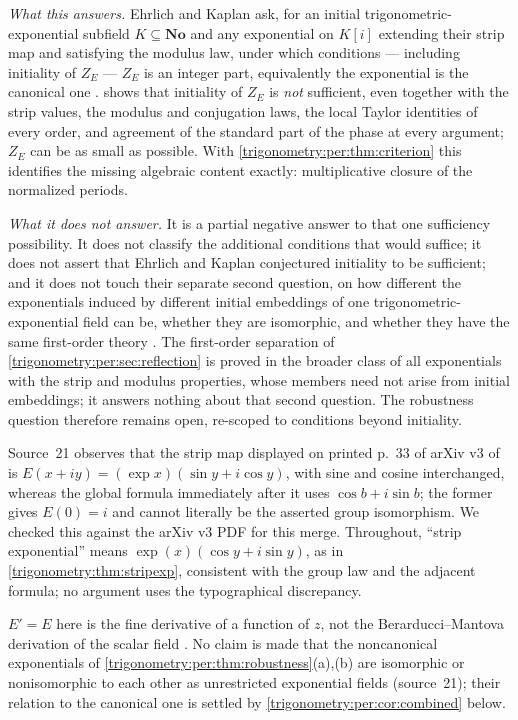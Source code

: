 \documentclass[11pt,letterpaper]{article}
\numberwithin{equation}{section}
\theoremstyle{definition}
\theoremstyle{remark}
\newcommand{\No}{\mathbf{No}}
\begin{document}
\emph{What this answers.} Ehrlich and Kaplan ask, for an initial trigonometric-exponential subfield
$K\subseteq\No$ and any exponential on $K[i]$ extending their strip map and satisfying the modulus law,
under which conditions --- including initiality of $Z_E$ --- $Z_E$ is an integer part, equivalently
the exponential is the canonical one \cite[\S11.1, first open question; arXiv v3, printed
p.~34]{EK}.  shows that initiality of $Z_E$ is \emph{not}
sufficient, even together with the strip values, the modulus and conjugation laws, the local Taylor
identities of every order, and agreement of the standard part of the phase at every argument; $Z_E$
can be as small as possible. With \cref{trigonometry:per:thm:criterion} this identifies the missing
algebraic content exactly: multiplicative closure of the normalized periods.

\emph{What it does not answer.} It is a partial negative answer to that one sufficiency possibility.
It does not classify the additional conditions that would suffice; it does not assert that Ehrlich and
Kaplan conjectured initiality to be sufficient; and it does not touch their separate second question,
on how different the exponentials induced by different initial embeddings of one
trigonometric-exponential field can be, whether they are isomorphic, and whether they have the same
first-order theory \cite[\S11.1, second open question]{EK}. The first-order separation of
\cref{trigonometry:per:sec:reflection} is proved in the broader class of all exponentials with the
strip and modulus properties, whose members need not arise from initial embeddings; it answers
nothing about that second question. The robustness question therefore remains open, re-scoped to
conditions beyond initiality.

\begin{remark}\label{trigonometry:per:rem:ekstrip}
Source~21 observes that the strip map displayed on printed p.~33 of arXiv v3 of \cite{EK} is
$E(x+iy)=(\exp x)(\sin y+i\cos y)$, with sine and cosine interchanged, whereas the global formula
immediately after it uses $\cos b+i\sin b$; the former gives $E(0)=i$ and cannot literally be the
asserted group isomorphism. We checked this against the arXiv v3 PDF for this merge. Throughout,
``strip exponential'' means $\exp(x)(\cos y+i\sin y)$, as in \cref{trigonometry:thm:stripexp},
consistent with the group law and the adjacent formula; no argument uses the typographical discrepancy.
\end{remark}
$E'=E$ here is the fine derivative of a function of $z$, not the Berarducci--Mantova derivation of
the scalar field \cite{BM}. No claim is made that the noncanonical exponentials of
\cref{trigonometry:per:thm:robustness}(a),(b) are isomorphic or nonisomorphic to each other as
unrestricted exponential fields (source~21); their relation to the canonical one is settled by
\cref{trigonometry:per:cor:combined} below.
\end{document}
